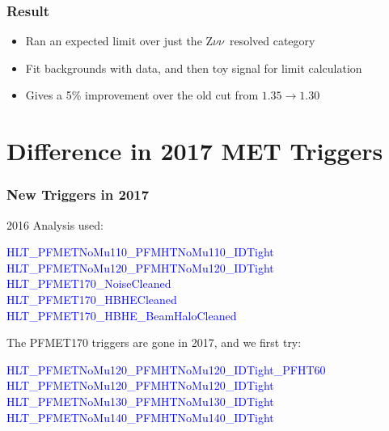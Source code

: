 \documentclass{beamer}
\newcommand{\Znn}{Z$\nu\nu$~}
\begin{document}
\begin{frame}
  \frametitle{Result}

  \begin{itemize}
  \item Ran an expected limit over just the \Znn resolved category
  \item Fit backgrounds with data, and then toy signal for limit calculation
  \item Gives a 5\% improvement over the old cut from $1.35 \rightarrow 1.30$
  \end{itemize}

\end{frame}

\section{Difference in 2017 MET Triggers}

\begin{frame}
  \tableofcontents[currentsection]
\end{frame}

\begin{frame}
  \frametitle{New Triggers in 2017}

  2016 Analysis used:

  \vspace{12pt}

  {\setlength{\parindent}{0cm} \ttfamily \textcolor{blue}{
    HLT\_PFMETNoMu110\_PFMHTNoMu110\_IDTight \\
    HLT\_PFMETNoMu120\_PFMHTNoMu120\_IDTight \\
    HLT\_PFMET170\_NoiseCleaned \\
    HLT\_PFMET170\_HBHECleaned \\
    HLT\_PFMET170\_HBHE\_BeamHaloCleaned
    }
  }

  \vspace{12pt}

  The PFMET170 triggers are gone in 2017, and we first try:

  \vspace{12pt}

  {\setlength{\parindent}{0cm} \ttfamily \textcolor{blue}{
    HLT\_PFMETNoMu120\_PFMHTNoMu120\_IDTight\_PFHT60 \\
    HLT\_PFMETNoMu120\_PFMHTNoMu120\_IDTight \\
    HLT\_PFMETNoMu130\_PFMHTNoMu130\_IDTight \\
    HLT\_PFMETNoMu140\_PFMHTNoMu140\_IDTight
    }
  }

\end{frame}
\end{document}
